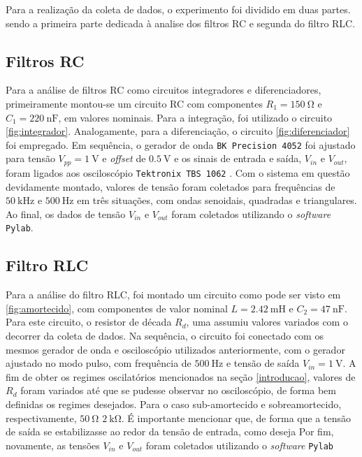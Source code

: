 Para a realização da coleta de dados, o experimento foi dividido em duas partes. sendo a primeira parte dedicada à analise dos filtros RC e segunda do filtro RLC.

\subsection{Filtros RC}

Para a análise de filtros RC como circuitos integradores e diferenciadores, primeiramente montou-se um circuito RC com componentes $R_1=\SI{150}{\ohm}$ e $C_1=\SI{220}{\nano\farad}$, em valores nominais. Para a integração, foi utilizado o circuito \ref{fig:integrador}. Analogamente, para a diferenciação, o circuito \ref{fig:diferenciador} foi empregado. Em sequência, o gerador de onda \texttt{BK Precision 4052} \cite{ref:gerador} foi ajustado para tensão $V_{pp}=\SI{1}{\volt}$ e \textit{offset} de $\SI{0,5}{\volt}$ e os sinais de entrada e saída, $V_{in}$ e $V_{out}$, foram ligados aos osciloscópio \texttt{Tektronix TBS 1062} \cite{ref:osciloscopio}. Com o sistema em questão devidamente montado, valores de tensão foram coletados para frequências de $\SI{50}{\kilo\hertz}$ e $\SI{500}{\hertz}$ em três situações, com ondas senoidais, quadradas e triangulares. Ao final, os dados de tensão $V_{in}$ e $V_{out}$ foram coletados utilizando o \textit{software} \texttt{Pylab}.

\subsection{Filtro RLC}

Para a análise do filtro RLC, foi montado um circuito como pode ser visto em \ref{fig:amortecido}, com componentes de valor nominal $L=\SI{2,42}{\milli\henry}$ e $C_{2}=\SI{47}{\nano\farad}$. Para este circuito, o resistor de década $R_{d}$, uma assumiu valores variados com o decorrer da coleta de dados. Na sequência, o circuito foi conectado com os mesmos gerador de onda e osciloscópio utilizados anteriormente, com o gerador ajustado no modo pulso, com frequência de $\SI{500}{\hertz}$ e tensão de saída $V_{in}=\SI{1}{\volt}$. A fim de obter os regimes oscilatórios mencionados na seção \ref{introducao}, valores de $R_d$ foram variados até que se pudesse observar no osciloscópio, de forma bem definidas os regimes desejados. Para o caso sub-amortecido e sobreamortecido, respectivamente, $\SI{50}{\ohm}$  $\SI{2}{\kilo\ohm}$. É importante mencionar que, de forma que a tensão de saída se estabilizasse ao redor da tensão de entrada, como deseja
Por fim, novamente, as tensões $V_{in}$ e $V_{out}$ foram coletados utilizando o \textit{software} \texttt{Pylab}



